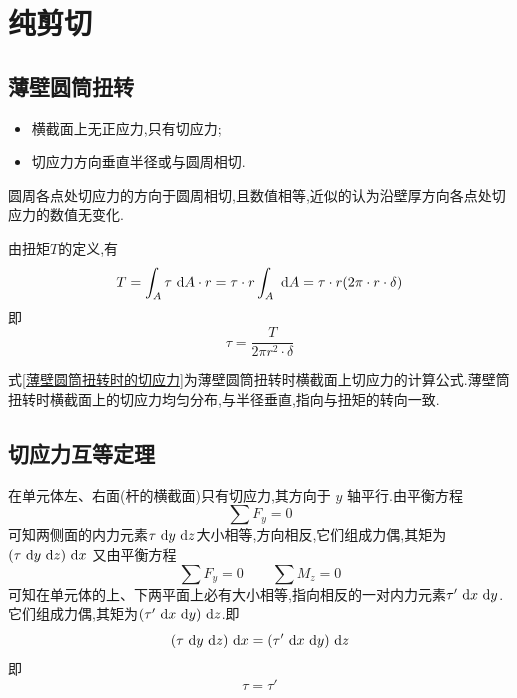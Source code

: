 \section{纯剪切}
\subsection{薄壁圆筒扭转}
\vspace{0.5em}
\smallboxb[受力特点]
	\begin{itemize}
	\item 横截面上无正应力,只有切应力;
	\item 切应力方向垂直半径或与圆周相切.
\end{itemize}
圆周各点处切应力的方向于圆周相切,且数值相等,近似的认为沿壁厚方向各点处切应力的数值无变化.

\begin{theorem}[薄壁圆筒扭转时的切应力]
	由扭矩$T$的定义,有
	$$
	T = \int_A \tau \, \, \text{d} A \cdot r = \tau \cdot r \int_A \, \, \text{d} A = \tau \cdot r (2 \pi \cdot r \cdot \delta)
	$$
	即
	\begin{equation}
		\tau = \frac{T}{2 \pi r^2 \cdot  \delta}
		\label{薄壁圆筒扭转时的切应力}
	\end{equation}
	\par 式\eqref{薄壁圆筒扭转时的切应力}为薄壁圆筒扭转时横截面上切应力的计算公式.薄壁筒扭转时横截面上的切应力均匀分布,与半径垂直,指向与扭矩的转向一致.
\end{theorem}

\subsection{切应力互等定理}
\begin{theorem}[切应力互等定理]
	在单元体左、右面(杆的横截面)只有切应力,其方向于 $y$ 轴平行.由平衡方程
	$$
	\sum F_y = 0
	$$
	可知两侧面的内力元素$\tau \, \, \text{d} y \, \, \text{d} z$大小相等,方向相反,它们组成力偶,其矩为 $(\tau \, \, \text{d} y \, \, \text{d} z) \, \, \text{d} x$
	又由平衡方程
	$$
	\sum F_y = 0 \quad \quad \sum M_z = 0
	$$
	可知在单元体的上、下两平面上必有大小相等,指向相反的一对内力元素$\tau'  \, \, \text{d} x \, \, \text{d} y$.\\
	它们组成力偶,其矩为$(\tau' \, \, \text{d} x \, \, \text{d} y) \, \, \text{d} z$.即
	$$
	(\tau \, \, \text{d} y \, \, \text{d} z) \, \, \text{d} x =(\tau' \, \, \text{d} x \, \, \text{d} y) \, \, \text{d} z
	$$
	即
	\begin{equation}
		\tau = \tau'
	\end{equation}
\par {}
\end{theorem}

